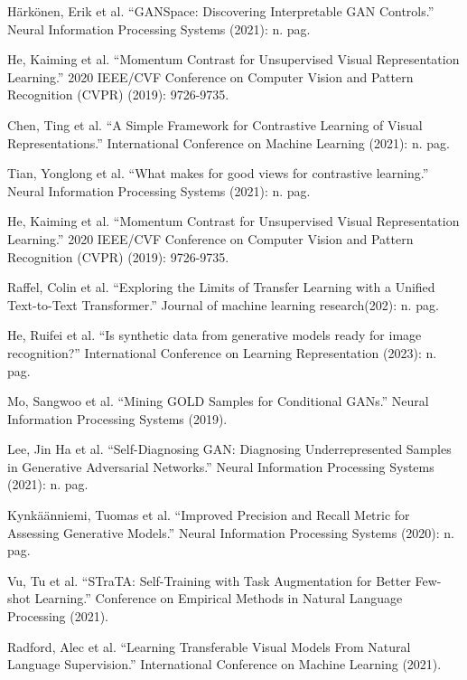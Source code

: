 \documentclass[preprint,12pt,authoryear]{elsarticle}
\begin{document}
\begin{thebibliography}{00}
Härkönen, Erik et al. “GANSpace: Discovering Interpretable GAN Controls.” Neural Information Processing Systems (2021): n. pag.

He, Kaiming et al. “Momentum Contrast for Unsupervised Visual Representation Learning.” 2020 IEEE/CVF Conference on Computer Vision and Pattern Recognition (CVPR) (2019): 9726-9735.

Chen, Ting et al. “A Simple Framework for Contrastive Learning of Visual Representations.” International Conference on Machine Learning
 (2021): n. pag.

Tian, Yonglong et al. “What makes for good views for contrastive learning.” Neural Information Processing Systems (2021): n. pag.

He, Kaiming et al. “Momentum Contrast for Unsupervised Visual Representation Learning.” 2020 IEEE/CVF Conference on Computer Vision and Pattern Recognition (CVPR) (2019): 9726-9735.

Raffel, Colin et al. “Exploring the Limits of Transfer Learning with a Unified Text-to-Text Transformer.” Journal of machine learning research(202): n. pag.

He, Ruifei et al. “Is synthetic data from generative models ready for image recognition?” International Conference on Learning Representation (2023): n. pag.

Mo, Sangwoo et al. “Mining GOLD Samples for Conditional GANs.” Neural Information Processing Systems (2019).

Lee, Jin Ha et al. “Self-Diagnosing GAN: Diagnosing Underrepresented Samples in Generative Adversarial Networks.” Neural Information Processing Systems (2021): n. pag.

 Kynkäänniemi, Tuomas et al. “Improved Precision and Recall Metric for Assessing Generative Models.” Neural Information Processing Systems (2020): n. pag.

Vu, Tu et al. “STraTA: Self-Training with Task Augmentation for Better Few-shot Learning.” Conference on Empirical Methods in Natural Language Processing (2021).

Radford, Alec et al. “Learning Transferable Visual Models From Natural Language Supervision.” International Conference on Machine Learning (2021).


\end{thebibliography}
\end{document}
